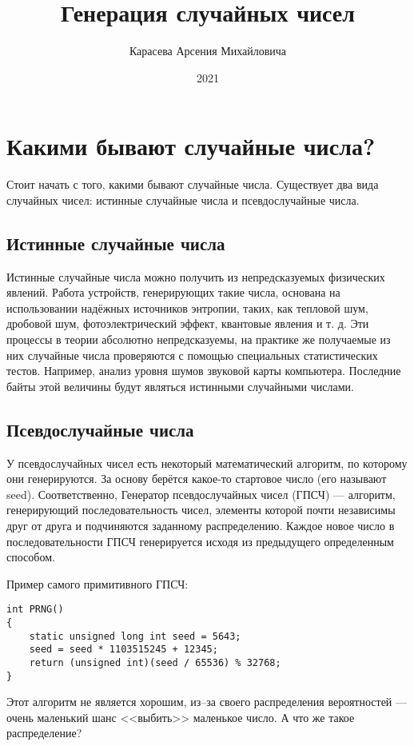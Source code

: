 \documentclass[bachelor, och, referat, times]{SCWorks}
\title{Генерация случайных чисел}
\author{Карасева Арсения Михайловича}
\date{2021}
\begin{document}
\renewcommand\theFancyVerbLine{\small\arabic{FancyVerbLine}}
\maketitle
\tableofcontents

\section{Какими бывают случайные числа?}
Стоит начать с того, какими бывают случайные числа. Существует два вида случайных чисел:
истинные случайные числа и псевдослучайные числа.

\subsection{Истинные случайные числа}
Истинные случайные числа можно получить из непредсказуемых физических явлений.
Работа устройств, генерирующих такие числа, основана на использовании надёжных источников энтропии, 
таких, как тепловой шум, дробовой шум, фотоэлектрический эффект, квантовые явления и т. д. 
Эти процессы в теории абсолютно непредсказуемы, на практике же получаемые из них 
случайные числа проверяются с помощью специальных статистических тестов.
Например, анализ уровня шумов звуковой карты компьютера.
Последние байты этой величины будут являться истинными случайными числами. \cite{trueRandGen}

\subsection{Псевдослучайные числа}
У псевдослучайных чисел есть некоторый математический алгоритм, по которому они генерируются.
За основу берётся какое-то стартовое число (его называют seed). Соответственно, Генератор псевдослучайных чисел
(ГПСЧ) --- алгоритм, генерирующий последовательность чисел, элементы которой почти независимы друг от друга 
и подчиняются заданному распределению. Каждое новое число в последовательности ГПСЧ генерируется исходя из 
предыдущего определенным способом. \cite{randNumGen}

Пример самого примитивного ГПСЧ:
\begin{verbatim}
int PRNG()
{
	static unsigned long int seed = 5643;
	seed = seed * 1103515245 + 12345;
	return (unsigned int)(seed / 65536) % 32768;
}
\end{verbatim}
Этот алгоритм не является хорошим, из--за своего распределения вероятностей — очень маленький шанс <<выбить>> маленькое число.
А что же такое распределение?
\end{document}
